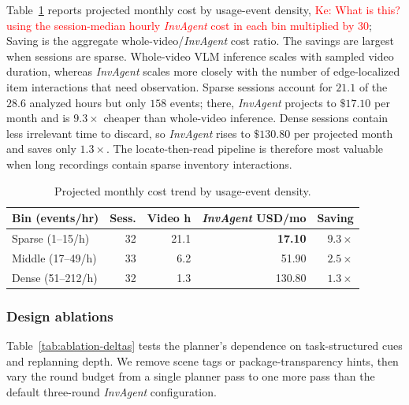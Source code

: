 \documentclass[sigconf,anonymous,nonacm]{acmart}
\newcommand{\todo}[1]{\textcolor{red}{#1}}
\newcommand{\sys}{\textit{InvAgent}\xspace}
\begin{document}
Table~\ref{tab:sparsity-cost} reports projected monthly cost by
usage-event density, \todo{Ke: What is this? using the session-median hourly \sys cost in each
bin multiplied by $30$}; Saving is the aggregate whole-video/\sys cost
ratio. The savings are largest when sessions are sparse. Whole-video
VLM inference scales with sampled video duration, whereas \sys scales
more closely with the number of edge-localized item interactions that
need observation. Sparse sessions account for $21.1$ of the $28.6$
analyzed hours but only $158$ events; there, \sys projects to
$\$17.10$ per month and is $9.3\times$ cheaper than whole-video
inference. Dense sessions contain less irrelevant time to discard, so
\sys rises to $\$130.80$ per projected month and saves only
$1.3\times$. The locate-then-read pipeline is therefore most valuable
when long recordings contain sparse inventory interactions.

\begin{table}[!htbp]
\centering
\small
\setlength{\tabcolsep}{3pt}
\caption{Projected monthly cost trend by usage-event density.}
\label{tab:sparsity-cost}
\begin{tabular}{@{}lrrrr@{}}
\toprule
Bin (events/hr) & Sess. & Video h & \sys USD/mo & Saving \\
\midrule
Sparse (1--15/h) & 32 & 21.1 & \textbf{17.10} & $\mathbf{9.3\times}$ \\
Middle (17--49/h) & 33 & 6.2 & 51.90 & $2.5\times$ \\
Dense (51--212/h) & 32 & 1.3 & 130.80 & $1.3\times$ \\
\bottomrule
\end{tabular}
\end{table}

\subsubsection{Design ablations}

Table~\ref{tab:ablation-deltas} tests the planner's dependence on
task-structured cues and replanning depth. We remove scene tags or
package-transparency hints, then vary the round budget from a single
planner pass to one more pass than the default three-round \sys
configuration.
\end{document}
